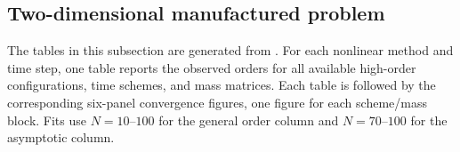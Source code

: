 \subsection{Two-dimensional manufactured problem}
The tables in this subsection are generated from
.
For each nonlinear method and time step, one table reports the observed
orders for all available high-order configurations, time schemes, and mass
matrices. Each table is followed by the corresponding six-panel convergence
figures, one figure for each scheme/mass block. Fits use $N=10$--$100$ for the
general order column and $N=70$--$100$ for the asymptotic column.

\subsubsection{}
